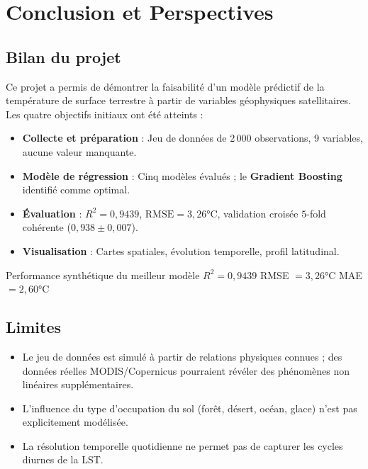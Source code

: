 \documentclass[a4paper,12pt]{report}
\begin{document}
\newpage
\chapter{Conclusion et Perspectives}

\section{Bilan du projet}

Ce projet a permis de d\'emontrer la faisabilit\'e d'un mod\`ele pr\'edictif de la temp\'erature de surface terrestre \`a partir de variables g\'eophysiques satellitaires. Les quatre objectifs initiaux ont \'et\'e atteints :

\begin{itemize}[leftmargin=2em]
  \item[$\checkmark$] \textbf{Collecte et pr\'eparation} : Jeu de donn\'ees de 2\,000 observations, 9 variables, aucune valeur manquante.
  \item[$\checkmark$] \textbf{Mod\`ele de r\'egression} : Cinq mod\`eles \'evalu\'es ; le \textbf{Gradient Boosting} identifi\'e comme optimal.
  \item[$\checkmark$] \textbf{\'Evaluation} : $R^2 = 0{,}9439$, $\text{RMSE} = 3{,}26$°C, validation crois\'ee $5$-fold coh\'erente ($0{,}938 \pm 0{,}007$).
  \item[$\checkmark$] \textbf{Visualisation} : Cartes spatiales, \'evolution temporelle, profil latitudinal.
\end{itemize}

\begin{resultatbox}{Performance synth\'etique du meilleur mod\`ele}
\centering
\large
$R^2 = 0{,}9439$ \hspace{1.5cm} RMSE $= 3{,}26$°C \hspace{1.5cm} MAE $= 2{,}60$°C
\end{resultatbox}

\section{Limites}

\begin{itemize}[leftmargin=2em]
  \item Le jeu de donn\'ees est simul\'e \`a partir de relations physiques connues ; des donn\'ees r\'eelles MODIS/Copernicus pourraient r\'ev\'eler des ph\'enom\`enes non lin\'eaires suppl\'ementaires.
  \item L'influence du type d'occupation du sol (for\^et, d\'esert, oc\'ean, glace) n'est pas explicitement mod\'elis\'ee.
  \item La r\'esolution temporelle quotidienne ne permet pas de capturer les cycles diurnes de la LST.
\end{itemize}
\end{document}
